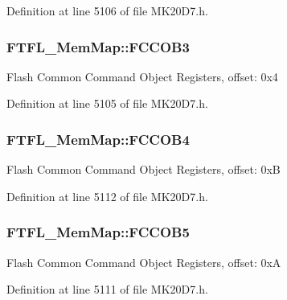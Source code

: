 Definition at line 5106 of file M\+K20\+D7.\+h.

\subsubsection[{\texorpdfstring{F\+C\+C\+O\+B3}{FCCOB3}}]{ F\+T\+F\+L\+\_\+\+Mem\+Map\+::\+F\+C\+C\+O\+B3}\hypertarget{struct_f_t_f_l___mem_map_ad8046f647e50794f4bee5f760113fabf}{}\label{struct_f_t_f_l___mem_map_ad8046f647e50794f4bee5f760113fabf}
Flash Common Command Object Registers, offset\+: 0x4 

Definition at line 5105 of file M\+K20\+D7.\+h.

\subsubsection[{\texorpdfstring{F\+C\+C\+O\+B4}{FCCOB4}}]{ F\+T\+F\+L\+\_\+\+Mem\+Map\+::\+F\+C\+C\+O\+B4}\hypertarget{struct_f_t_f_l___mem_map_acc4efadce533f11bfbb6924d6445de0f}{}\label{struct_f_t_f_l___mem_map_acc4efadce533f11bfbb6924d6445de0f}
Flash Common Command Object Registers, offset\+: 0xB 

Definition at line 5112 of file M\+K20\+D7.\+h.

\subsubsection[{\texorpdfstring{F\+C\+C\+O\+B5}{FCCOB5}}]{ F\+T\+F\+L\+\_\+\+Mem\+Map\+::\+F\+C\+C\+O\+B5}\hypertarget{struct_f_t_f_l___mem_map_a90ebc3ff5d920da86cfb5673abb9ea6f}{}\label{struct_f_t_f_l___mem_map_a90ebc3ff5d920da86cfb5673abb9ea6f}
Flash Common Command Object Registers, offset\+: 0xA 

Definition at line 5111 of file M\+K20\+D7.\+h.

